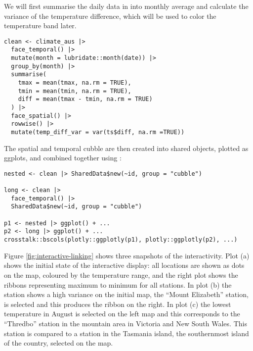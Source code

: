 \documentclass[
  shortnames]{jss}
\begin{document}
We will first summarise the daily data in  into monthly average and calculate the variance of the temperature difference, which will be used to color the temperature band later.

\begin{verbatim}
clean <- climate_aus |>
  face_temporal() |> 
  mutate(month = lubridate::month(date)) |>
  group_by(month) |>
  summarise(
    tmax = mean(tmax, na.rm = TRUE),
    tmin = mean(tmin, na.rm = TRUE),
    diff = mean(tmax - tmin, na.rm = TRUE)
  ) |> 
  face_spatial() |> 
  rowwise() |>
  mutate(temp_diff_var = var(ts$diff, na.rm =TRUE))
\end{verbatim}

The spatial and temporal cubble are then created into shared  objects, plotted as ggplots, and combined together using :

\begin{verbatim}
nested <- clean |> SharedData$new(~id, group = "cubble")

long <- clean |> 
  face_temporal() |> 
  SharedData$new(~id, group = "cubble")
  
p1 <- nested |> ggplot() + ...
p2 <- long |> ggplot() + ...
crosstalk::bscols(plotly::ggplotly(p1), plotly::ggplotly(p2), ...)
\end{verbatim}

Figure \ref{fig:interactive-linking} shows three snapshots of the interactivity. Plot (a) shows the initial state of the interactive display: all locations are shown as dots on the map, coloured by the temperature range, and the right plot shows the ribbons representing maximum to minimum for all stations. In plot (b) the station shows a high variance on the initial map, the ``Mount Elizabeth'' station, is selected and this produces the ribbon on the right. In plot (c) the lowest temperature in August is selected on the left map and this corresponds to the ``Thredbo'' station in the mountain area in Victoria and New South Wales. This station is compared to a station in the Tasmania island, the southernmost island of the country, selected on the map.
\end{document}
